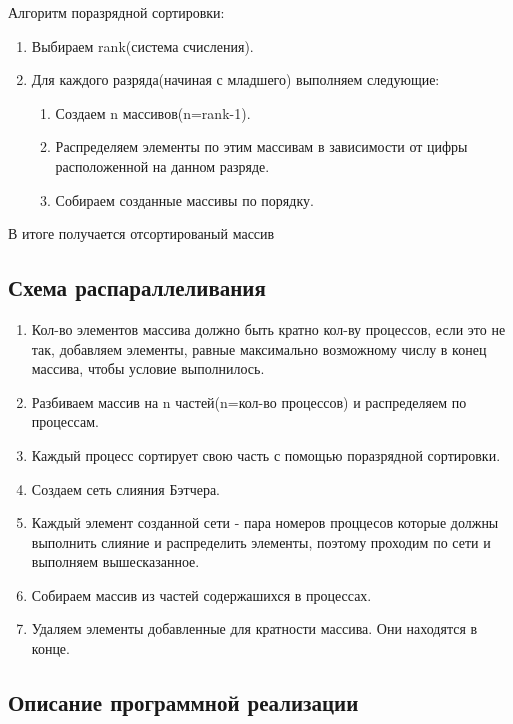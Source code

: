 \documentclass{report}
\begin{document}
Алгоритм поразрядной сортировки: 
\begin{enumerate}
\item Выбираем rank(система счисления).
\item Для каждого разряда(начиная с младшего) выполняем следующие:
\begin{enumerate}
\item Создаем n массивов(n=rank-1).
\item Распределяем элементы по этим массивам в зависимости от цифры расположенной на данном разряде.
\item Собираем созданные массивы по порядку.
\end{enumerate}
\end{enumerate}
В итоге получается отсортированый массив

\newpage
\begin{center}
\section*{Схема распараллеливания}
\end{center}

\begin{enumerate}
\item Кол-во элементов массива должно быть кратно кол-ву процессов, если это не так, добавляем элементы, равные максимально возможному числу в конец массива, чтобы условие выполнилось.
\item Разбиваем массив на n частей(n=кол-во процессов) и распределяем по процессам.
\item Каждый процесс сортирует свою часть с помощью поразрядной сортировки.
\item Создаем сеть слияния Бэтчера.
\item Каждый элемент созданной сети - пара номеров проццесов которые должны выполнить слияние и распределить элементы, поэтому проходим по сети и выполняем вышесказанное.
\item Собираем массив из частей содержашихся в процессах.
\item Удаляем элементы добавленные для кратности массива. Они находятся в конце.
\end{enumerate}

\newpage
\begin{center}
\section*{Описание программной реализации}
\end{center}
\end{document}
